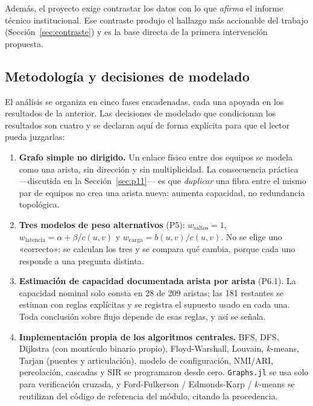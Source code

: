 \documentclass[10pt,a4paper]{extarticle}
\newcommand{\code}[1]{\texttt{\small #1}}
\begin{document}
Además, el proyecto exige contrastar los datos con lo que \textit{afirma} el informe
técnico institucional. Ese contraste produjo el hallazgo más accionable del trabajo
(Sección~\ref{sec:contraste}) y es la base directa de la primera intervención propuesta.

\subsection{Metodología y decisiones de modelado}

El análisis se organiza en cinco fases encadenadas, cada una apoyada en los resultados de
la anterior. Las decisiones de modelado que condicionan los resultados son cuatro y se
declaran aquí de forma explícita para que el lector pueda juzgarlas:

\begin{enumerate}[leftmargin=*,itemsep=1.5mm]
\item \textbf{Grafo simple no dirigido.} Un enlace físico entre dos equipos se modela como
una arista, sin dirección y sin multiplicidad. La consecuencia práctica ---discutida en la
Sección~\ref{sec:p11}--- es que \textit{duplicar} una fibra entre el mismo par de equipos
no crea una arista nueva: aumenta capacidad, no redundancia topológica.

\item \textbf{Tres modelos de peso alternativos} (P5): $w_{\text{saltos}} = 1$,
$w_{\text{latencia}} = \alpha + \beta/c(u,v)$ y $w_{\text{carga}} = b(u,v)/c(u,v)$. No se
elige uno «correcto»: se calculan los tres y se compara qué cambia, porque cada uno
responde a una pregunta distinta.

\item \textbf{Estimación de capacidad documentada arista por arista} (P6.1). La capacidad
nominal solo consta en 28 de 209 aristas; las 181 restantes se estiman con reglas
explícitas y se registra el supuesto usado en cada una. Toda conclusión sobre flujo
depende de esas reglas, y así se señala.

\item \textbf{Implementación propia de los algoritmos centrales.} BFS, DFS, Dijkstra
(con montículo binario propio), Floyd-Warshall, Louvain, $k$-means, Tarjan (puentes y
articulación), modelo de configuración, NMI/ARI, percolación, cascadas y SIR se
programaron desde cero. \code{Graphs.jl} se usa solo para verificación cruzada, y
Ford-Fulkerson / Edmonds-Karp / $k$-means se reutilizan del código de referencia del
módulo, citando la procedencia.
\end{enumerate}
\end{document}
